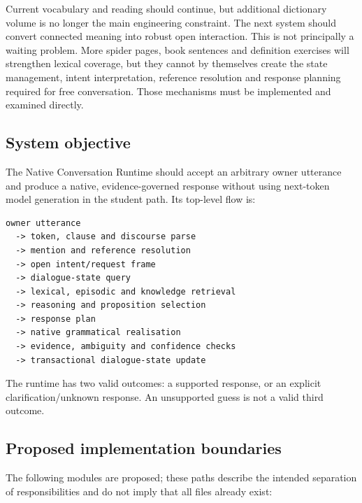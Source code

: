 \documentclass[11pt,a4paper]{article}
\begin{document}
Current vocabulary and reading should continue, but additional dictionary volume is no longer the
main engineering constraint.  The next system should convert connected meaning into robust open
interaction.  This is not principally a waiting problem.  More spider pages, book sentences and
definition exercises will strengthen lexical coverage, but they cannot by themselves create the
state management, intent interpretation, reference resolution and response planning required for
free conversation.  Those mechanisms must be implemented and examined directly.

\subsection{System objective}

The Native Conversation Runtime should accept an arbitrary owner utterance and produce a native,
evidence-governed response without using next-token model generation in the student path.  Its
top-level flow is:

\begin{lstlisting}
owner utterance
  -> token, clause and discourse parse
  -> mention and reference resolution
  -> open intent/request frame
  -> dialogue-state query
  -> lexical, episodic and knowledge retrieval
  -> reasoning and proposition selection
  -> response plan
  -> native grammatical realisation
  -> evidence, ambiguity and confidence checks
  -> transactional dialogue-state update
\end{lstlisting}

The runtime has two valid outcomes: a supported response, or an explicit clarification/unknown
response.  An unsupported guess is not a valid third outcome.

\subsection{Proposed implementation boundaries}

The following modules are proposed; these paths describe the intended separation of
responsibilities and do not imply that all files already exist:
\end{document}
